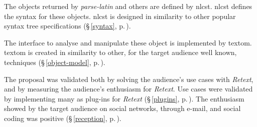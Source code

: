 The objects returned by \emph{parse-latin} and others are defined by
  \acrshort{nlcst}. \acrshort{nlcst} defines the syntax for these objects.
  \acrshort{nlcst} is designed in similarity to other popular syntax tree
  specifications (§\,\ref{syntax}, p.\,\pageref{syntax}).

The interface to analyse and manipulate these object is implemented by
  \gls{textom}. \gls{textom} is created in similarity to other, for the target
  audience well known, techniques
  (§\,\ref{object-model}, p.\,\pageref{object-model}).

The proposal was validated both by solving the audience's use cases with
  \emph{Retext}, and by measuring the audience's enthusiasm for \emph{Retext}.
Use cases were validated by implementing many as plug-ins for
  \emph{Retext} (§\,\ref{plugins}, p.\,\pageref{plugins}).
The enthusiasm showed by the target audience on social networks, through
  e-mail, and social coding was positive
  (§\,\ref{reception}, p.\,\pageref{reception}).

\endgroup
